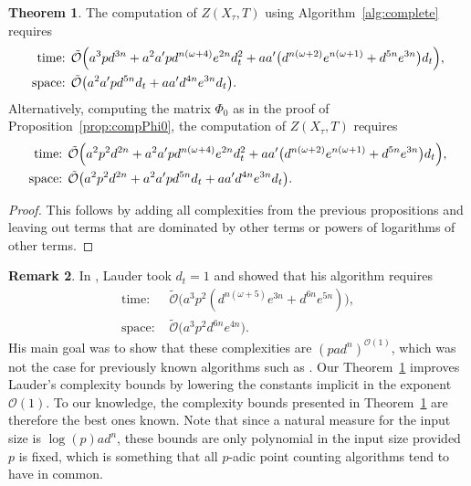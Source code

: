 \documentclass[a4paper,11pt]{article}
\numberwithin{equation}{section}
\providecommand{\BigOh}{\mathcal{O}}          %
\providecommand{\SoftOh}{\tilde{\mathcal{O}}} %
\theoremstyle{definition}
\newtheorem{thm}{Theorem}[section]
\newtheorem{rem}[thm]{Remark}
\begin{document}
\begin{thm} \label{thm:totalcomplexity}
The computation of $Z(X_{\tau},T)$ using Algorithm~\ref{alg:complete} requires
\begin{align*}
\mbox{time: }  &\SoftOh\Bigl( 
                a^3 p d^{3n} + 
                a^2 a' p d^{n(\omega+4)} e^{2n} d_t^2+
                aa' \bigl(d^{n(\omega+2)} e^{n(\omega+1)}+ d^{5n} e^{3n}\bigr) d_t 
                \Bigr), \\
\mbox{space: } &\SoftOh\bigl( a^2 a' p d^{5n} d_t + a a' d^{4n} e^{3n} d_t \bigr).
\end{align*}
Alternatively, computing the matrix $\Phi_0$ as in the proof of Proposition~\ref{prop:compPhi0}, 
the computation of $Z(X_{\tau},T)$ requires
\begin{align*}
\mbox{time: }  &\SoftOh\Bigl( 
                a^2 p^2 d^{2n} + 
                a^2 a' p d^{n(\omega+4)} e^{2n} d_t^2+
                aa' \bigl(d^{n(\omega+2)} e^{n(\omega+1)}+ d^{5n} e^{3n}\bigr) d_t 
                \Bigr), \\
\mbox{space: } &\SoftOh\bigl( 
                a^2 p^2 d^{2n} + 
                a^2 a' p d^{5n} d_t + 
                a a' d^{4n} e^{3n} d_t \bigr).
\end{align*}
\end{thm}

\begin{proof}
This follows by adding all complexities from the previous propositions and 
leaving out terms that are dominated by other terms or powers of
logarithms of other terms.
\end{proof}

\begin{rem} In \citep{Lauder2004a}, Lauder took $d_t=1$ and showed that his
algorithm requires
\begin{align*}
\mbox{time: }  &\SoftOh\bigl(a^3 p^2 (d^{n(\omega+5)} e^{3n} + d^{6n} e^{5n}) \bigr), \\ 
\mbox{space: } &\SoftOh\bigl(a^3 p^2 d^{6n} e^{4n} \bigr).
\end{align*}
His main goal was to show that these complexities are $(pad^n)^{\BigOh(1)}$, 
which was not the case for previously known algorithms such as 
\citep{AbbottKedlayaRoe2006, LauderWan2008}. 
Our Theorem~\ref{thm:totalcomplexity} improves Lauder's complexity bounds 
by lowering the constants implicit in the exponent~$\BigOh(1)$.  To our 
knowledge, the complexity bounds presented in Theorem~\ref{thm:totalcomplexity} 
are therefore the best ones known.  Note that since a natural measure for the 
input size is $\log(p) a d^n$, these bounds are only polynomial in the 
input size provided $p$ is fixed, which is something that all $p$-adic 
point counting algorithms tend to have in common.
\end{rem}
\end{document}
